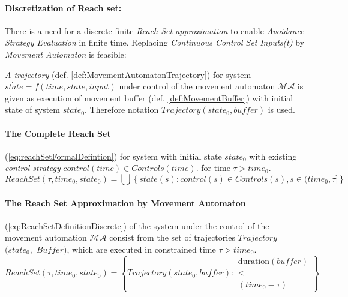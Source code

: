     
    \paragraph{Discretization of Reach set:} There is a need for a discrete finite \emph{Reach Set approximation} to enable \emph{Avoidance Strategy Evaluation} in finite time. Replacing \emph{Continuous Control Set} \emph{Inputs(t)} by \emph{Movement Automaton} is feasible:
    
    
    \begin{definition}\label{def:ReachSetApproximationByMovementAutomaton}
        \emph{A trajectory} (def. \ref{def:MovementAutomatonTrajectory}) for system $\dot{state}=f(time,state,input)$ under control of the movement automaton $\mathscr{MA}$ is given as execution of movement buffer (def. \ref{def:MovementBuffer}) with initial state of system $state_0$.  Therefore notation $Trajectory(state_0,buffer)$ is used.
    
        
        \paragraph{The Complete Reach Set} (\ref{eq:reachSetFormalDefintion}) for system with initial state $state_0$ with existing \emph{control strategy} $control(time)\in Controls(time)$. for time  $\tau > time_0$.
        \begin{equation}\label{eq:reachSetFormalDefintion}
            ReachSet(\tau,time_0,state_0) = \bigcup \left\{state(s):control(s)\in Controls(s), s\in (time_0,\tau]\right\} 
        \end{equation}
        
        
        \paragraph{The Reach Set Approximation by Movement Automaton} (\ref{eq:ReachSetDefinitionDiscrete}) of the system under the control of the movement automation $\mathscr{MA}$ consist from the set of trajectories $Trajectory$ $(state_0,$ $Buffer)$, which are executed in constrained time $\tau > time_0$.
        \begin{equation}\label{eq:ReachSetDefinitionDiscrete}
             ReachSet(\tau,time_0,state_0)=\left\{Trajectory(state_0,buffer):
             \begin{gathered}
                \text{duration}(buffer)\\ \le\\ (time_0-\tau)
             \end{gathered}\right\}
        \end{equation}
    \end{definition}
    
